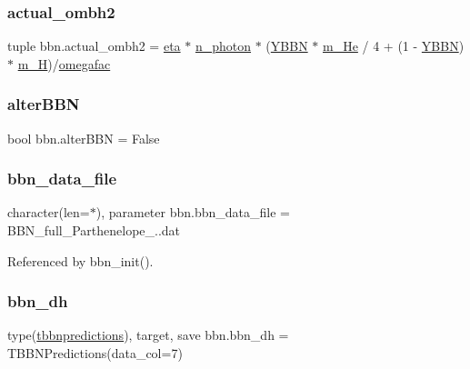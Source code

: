 \subsubsection{\texorpdfstring{actual\+\_\+ombh2}{actual\_ombh2}}
{\footnotesize\ttfamily tuple bbn.\+actual\+\_\+ombh2 = \mbox{\hyperlink{namespacebbn_ace64c472b0c59f5fd0f811cd4dcdc2b4}{eta}} $\ast$ \mbox{\hyperlink{namespacebbn_afb075d5c6ea4d70b7b6b502224ffbac9}{n\+\_\+photon}} $\ast$ (\mbox{\hyperlink{namespacebbn_a14098dbddadc5e64b5441f3d19aaf7c1}{Y\+B\+BN}} $\ast$ \mbox{\hyperlink{namespacebbn_a5659e9c09b2847f14bb66c2d73e68191}{m\+\_\+\+He}} / 4 + (1 -\/ \mbox{\hyperlink{namespacebbn_a14098dbddadc5e64b5441f3d19aaf7c1}{Y\+B\+BN}}) $\ast$ \mbox{\hyperlink{namespacebbn_af144f84053152a233d6f7fe2f505589f}{m\+\_\+H}})/\mbox{\hyperlink{namespacebbn_a7add864cda923ca0a40fda7711df51d5}{omegafac}}}

\mbox{\label{namespacebbn_a218e3fff3cfb1735bc090edc24af0ba0}} 
\subsubsection{\texorpdfstring{alter\+B\+BN}{alterBBN}}
{\footnotesize\ttfamily bool bbn.\+alter\+B\+BN = False}

\mbox{\label{namespacebbn_a177fdccd2bbdc4ff1dd71c8047184d91}} 
\subsubsection{\texorpdfstring{bbn\+\_\+data\+\_\+file}{bbn\_data\_file}}
{\footnotesize\ttfamily character(len=$\ast$), parameter bbn.\+bbn\+\_\+data\+\_\+file = \textquotesingle{}B\+B\+N\+\_\+full\+\_\+\+Parthenelope\+\_..\+dat\textquotesingle{}}



Referenced by bbn\+\_\+init().

\mbox{\label{namespacebbn_af26d781a68adbe31f1993cc7e36a6e50}} 
\subsubsection{\texorpdfstring{bbn\+\_\+dh}{bbn\_dh}}
{\footnotesize\ttfamily type(\mbox{\hyperlink{structbbn_1_1tbbnpredictions}{tbbnpredictions}}), target, save bbn.\+bbn\+\_\+dh = T\+B\+B\+N\+Predictions(data\+\_\+col=7)}



